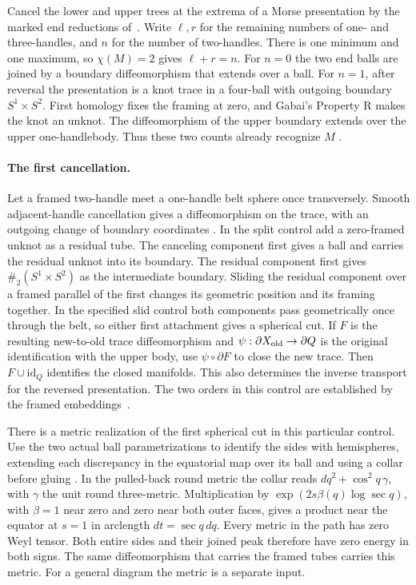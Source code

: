 \documentclass[11pt,letterpaper]{article}
\numberwithin{equation}{section}
\begin{document}
Cancel the lower and upper trees at the extrema of a Morse
presentation by the marked end reductions of~\cite{Baker2026MarkedHeights}.
Write \(\ell,r\) for the remaining numbers of one- and three-handles,
and \(n\) for the number of two-handles. There is one minimum and one
maximum, so \(\chi(M)=2\) gives \(\ell+r=n\). For \(n=0\) the two end
balls are joined by a boundary diffeomorphism that extends over a ball.
For \(n=1\), after reversal the presentation is a knot trace in a
four-ball with outgoing boundary \(S^1\times S^2\). First homology fixes
the framing at zero, and Gabai's Property R makes the knot an unknot.
The diffeomorphism of the upper boundary extends over the upper
one-handlebody. Thus these two counts already recognize \(M\)
\cite{Gabai1987FoliationsIII,LaudenbachPoenaru1972Handlebodies,Baker2026MarkedHeights}.

\paragraph{The first cancellation.}
Let a framed two-handle meet a one-handle belt sphere once transversely.
Smooth adjacent-handle cancellation gives a diffeomorphism on the
trace, with an outgoing change of boundary coordinates
\cite{Milnor1965HCobordism}. In the split control add a zero-framed
unknot as a residual tube. The canceling component first gives a ball
and carries the residual unknot into its boundary. The residual
component first gives \(\#_2(S^1\times S^2)\) as the intermediate
boundary. Sliding the residual component over a framed parallel of
the first changes its geometric position and its framing together.
In the specified slid control both components pass geometrically once
through the belt, so either first attachment gives a spherical cut.
If \(F\) is the resulting new-to-old trace diffeomorphism and
\(\psi:\partial X_{\rm old}\to\partial Q\) is the original
identification with the upper body, use \(\psi\circ\partial F\) to
close the new trace. Then \(F\cup\mathrm{id}_Q\) identifies the
closed manifolds. This also determines the inverse transport for the
reversed presentation. The two orders in this control are established
by the framed embeddings~\cite{Baker2026HandleCuts}.

There is a metric realization of the first spherical cut in this
particular control. Use the two actual ball parametrizations to
identify the sides with hemispheres, extending each discrepancy in
the equatorial map over its ball and using a collar before gluing
\cite{Hatcher1983Smale,Palais1960Extending}. In the pulled-back round
metric the collar reads \(dq^2+\cos^2 q\,\gamma\), with \(\gamma\)
the unit round three-metric. Multiplication by
\(\exp(2s\beta(q)\log\sec q)\), with \(\beta=1\) near zero and zero
near both outer faces, gives a product near the equator at \(s=1\)
in arclength \(dt=\sec q\,dq\). Every metric in the path has zero
Weyl tensor. Both entire sides and their joined peak therefore have
zero energy in both signs. The same diffeomorphism that carries the
framed tubes carries this metric. For a general diagram the metric is
a separate input.
\end{document}
